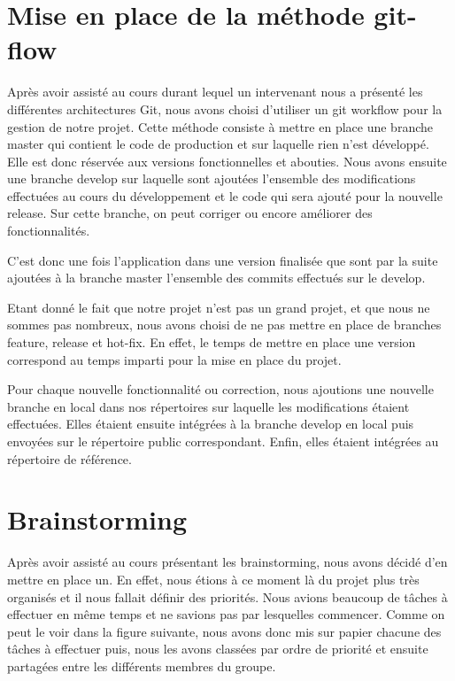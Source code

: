 \documentclass{report}
\begin{document}
\section{Mise en place de la méthode git-flow}
\hspace{0.5cm}Après avoir assisté au cours durant lequel un intervenant nous a présenté les différentes architectures Git, nous avons choisi d'utiliser un git workflow pour la gestion de notre projet. Cette méthode consiste à mettre en place une branche master qui contient le code de production et sur laquelle rien n'est développé. Elle est donc réservée aux versions fonctionnelles et abouties.
Nous avons ensuite une branche develop sur laquelle sont ajoutées l'ensemble des modifications effectuées au cours du développement et le code qui sera ajouté pour la nouvelle release. Sur cette branche, on peut corriger ou encore améliorer des fonctionnalités. \par
C'est donc une fois l'application dans une version finalisée que sont par la suite ajoutées à la branche master l'ensemble des commits effectués sur le develop.\par
Etant donné le fait que notre projet n'est pas un grand projet, et que nous ne sommes pas nombreux, nous avons choisi de ne pas mettre en place de branches feature, release et hot-fix. En effet, le temps de mettre en place une version correspond au temps imparti pour la mise en place du projet.\par
Pour chaque nouvelle fonctionnalité ou correction, nous ajoutions une nouvelle branche en local dans nos répertoires sur laquelle les modifications étaient effectuées. Elles étaient ensuite intégrées à la branche develop en local puis envoyées sur le répertoire public correspondant. Enfin, elles étaient intégrées au répertoire de référence.\par


\section{Brainstorming}
\hspace{0.5cm}Après avoir assisté au cours présentant les brainstorming, nous avons décidé d'en mettre en place un. En effet, nous étions à ce moment là du projet plus très organisés et il nous fallait définir des priorités. Nous avions beaucoup de tâches à effectuer en même temps et ne savions pas par lesquelles commencer. Comme on peut le voir dans la figure suivante, nous avons donc mis sur papier chacune des tâches à effectuer puis, nous les avons classées par ordre de priorité et ensuite partagées entre les différents membres du groupe. \par
\end{document}
